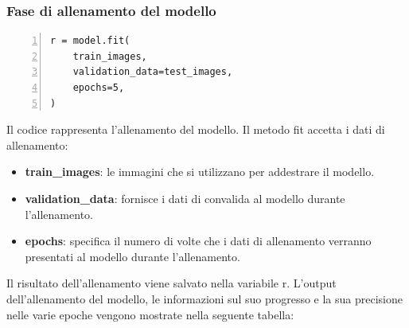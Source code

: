 \documentclass[a4paper,final,12pt]{report}
\begin{document}
\newpage
\subsubsection{Fase di allenamento del modello}
\begin{lstlisting}[caption={Fase di allenamento del modello.}, label={lst:allenamento_modello}, breaklines, escapechar=`\%, frame=lines, basicstyle=\small\ttfamily, keepspaces=true, numbers=left]
r = model.fit(
    train_images,
    validation_data=test_images,
    epochs=5,
)
\end{lstlisting}
Il codice rappresenta l'allenamento del modello. Il metodo fit accetta i dati di allenamento:
\begin{itemize}
    \item \textbf{train\_images}:  le immagini che si utilizzano per addestrare il modello.
    \item \textbf{validation\_data}: fornisce i dati di convalida al modello durante l'allenamento.
    \item  \textbf{epochs}: specifica il numero di volte che i dati di allenamento verranno presentati al modello durante l'allenamento.
\end{itemize}
Il risultato dell'allenamento viene salvato nella variabile r.
L'output dell'allenamento del modello, le informazioni sul suo progresso e la sua precisione nelle varie epoche vengono mostrate nella seguente tabella:
\end{document}
